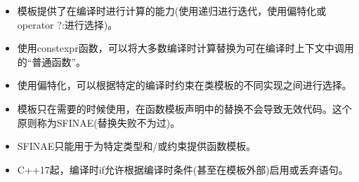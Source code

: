 
\begin{itemize}
\item 
模板提供了在编译时进行计算的能力(使用递归进行迭代，使用偏特化或operator ?:进行选择)。

\item 
使用constexpr函数，可以将大多数编译时计算替换为可在编译时上下文中调用的“普通函数”。

\item 
使用偏特化，可以根据特定的编译时约束在类模板的不同实现之间进行选择。

\item 
模板只在需要的时候使用，在函数模板声明中的替换不会导致无效代码。这个原则称为SFINAE(替换失败不为过)。

\item 
SFINAE只能用于为特定类型和/或约束提供函数模板。

\item 
C++17起，编译时if允许根据编译时条件(甚至在模板外部)启用或丢弃语句。
\end{itemize}
